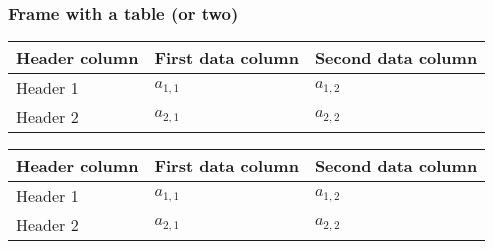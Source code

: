 \documentclass[tikz]{beamer}
\begin{document}
\begin{frame}
\frametitle{Frame with a table (or two)}
\begin{center}
\begin{tabular}{l | l l }
\toprule
Header column & First data column & Second data column \\
\midrule
Header 1 & \(a_{1,1}\) & \(a_{1,2}\) \\
Header 2 & \(a_{2,1}\) & \(a_{2,2}\) \\
\bottomrule
\end{tabular}
\end{center}
\begin{center}
\begin{tabular}{l | l l }
\toprule
Header column & First data column & Second data column \\
\midrule
Header 1 & \(a_{1,1}\) & \(a_{1,2}\) \\
Header 2 & \(a_{2,1}\) & \(a_{2,2}\) \\
\bottomrule
\end{tabular}
\end{center}
\end{frame}
\end{document}
